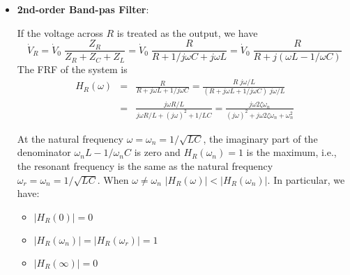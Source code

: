 \documentclass{article}
\begin{document}
\begin{itemize}

\item {\bf 2nd-order Band-pas Filter}:

  If the voltage across $R$ is treated as the output, we have
  \begin{equation}
    \dot{V}_R=\dot{V}_0\;\frac{Z_R}{Z_R+Z_C+Z_L}
    =\dot{V}_0\;\frac{R}{R+1/j\omega C+j\omega L}
    =\dot{V}_0\;\frac{R}{R+j(\omega L-1/\omega C)}
  \end{equation}
  The FRF of the system is
  \begin{eqnarray}
    H_R(\omega)&=&\frac{R}{R+j\omega L+1/j\omega C}
    =\frac{R \;j\omega/L}{(R+j\omega L+1/j\omega C)\;j\omega/L}
    \nonumber\\
    &=&\frac{j\omega R/L}{j\omega R/L+(j\omega)^2+1/LC}
    =\frac{j\omega 2\zeta \omega_n}{(j\omega)^2
      +j\omega 2\zeta \omega_n+\omega_n^2}	
  \end{eqnarray}

  At the natural frequency $\omega=\omega_n=1/\sqrt{LC}$, the imaginary 
  part of the denominator $\omega_n L-1/\omega_n C$ is zero and 
  $H_R(\omega_n)=1$ is the maximum, i.e., the resonant frequency is the 
  same as the natural frequency $\omega_r=\omega_n=1/\sqrt{LC}$. When 
  $\omega\ne \omega_n$ $|H_R(\omega)|<|H_R(\omega_n)|$. In particular,
  we have:

  \begin{itemize}
  \item $|H_R(0)|=0$
  \item $|H_R(\omega_n)|=|H_R(\omega_r)|=1$
  \item $|H_R(\infty)|=0$
  \end{itemize}


\end{itemize}
\end{document}
